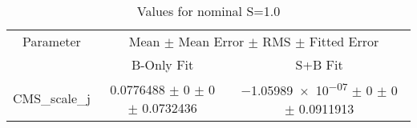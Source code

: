 \begin{table}
\centering
\caption{Values for nominal S=1.0}
\begin{tabular}{ccc}
\toprule
Parameter 	& \multicolumn{2}{c}{Mean $\pm$ Mean Error $\pm$ RMS $\pm$ Fitted Error}\\
 	& B-Only Fit & S+B Fit\\
\midrule
CMS\_scale\_j 	& \num{0.0776488} $\pm$ \num{0} $\pm$ \num{0} $\pm$ \num{0.0732436} 	& \num{-1.05989e-07} $\pm$ \num{0} $\pm$ \num{0} $\pm$ \num{0.0911913}\\
\bottomrule
\end{tabular}
\end{table}